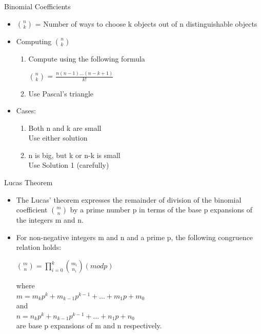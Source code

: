 \documentclass{beamer}
\begin{document}
\begin{frame}[<+->]{Binomial Coefficients}
  \begin{block}{}
    \begin{itemize}
      \item ${n \choose k}$ = Number of ways to choose k objects out of n distinguishable objects
      \item Computing ${n \choose k}$
	\begin{enumerate}
	  \item Compute using the following formula\\
	    \begin{center}${n \choose k}$ = $\frac{n(n-1) \dots (n-k+1)}{k!}$\end{center}
	  \item Use Pascal's triangle
	\end{enumerate}
      \item Cases:
	\begin{enumerate}
	  \item Both n and k are small\\
	    Use either solution
	  \item n is big, but k or n-k is small\\
	    Use Solution 1 (carefully)
	\end{enumerate}
    \end{itemize}
  \end{block}
\end{frame}

\begin{frame}[<+->]{Lucas Theorem}
  \begin{block}{}
    \begin{itemize}
      \item The Lucas' theorem expresses the remainder of division of the binomial coefficient ${m \choose n}$ by a prime number p in terms of the base p expansions of the integers m and n.
      \item For non-negative integers m and n and a prime p, the following congruence relation holds:\\
	\begin{center}${m \choose n} = \prod_{i=0}^k {m_i \choose n_i}  (mod p)$\end{center}
	where\\
	$m = m_{k}p^{k} + m_{k-1}p^{k-1} + \dots + m_1p + m_0 $\\
	and\\
	$n = n_{k}p^{k} + n_{k-1}p^{k-1} + \dots + n_1p + n_0 $\\
	are base p expansions of m and n respectively.
    \end{itemize}
  \end{block}
\end{frame}
\end{document}
